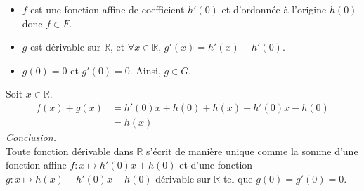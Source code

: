 \documentclass[10pt]{article}
\begin{document}
\begin{tcolorbox}[enhanced, width=7in, center, size=fbox, fontupper=\large, drop shadow southwest]
\begin{equation*}
    \end{equation*}
    \begin{itemize}
        \item $f$ est une fonction affine de coefficient $h'(0)$ et d'ordonnée à l'origine $h(0)$ donc $f\in F$.
        \item $g$ est dérivable sur $\mathbb{R}$, et $\forall{x\in\mathbb{R}}$, $g'(x)=h'(x)-h'(0)$.
        \item $g(0)=0$ et $g'(0)=0$. Ainsi, $g\in G$.
    \end{itemize}
    Soit $x\in\mathbb{R}$.
    \begin{align*}
        f(x) + g(x) 
        &= h'(0)x + h(0) + h(x) - h'(0)x - h(0)\\
        &= h(x)
    \end{align*}
    \emph{Conclusion.}\\
    Toute fonction dérivable dans $\mathbb{R}$ s'écrit de manière unique comme la somme d'une fonction affine $f:x\mapsto h'(0)x+h(0)$ et d'une fonction $g:x\mapsto h(x)-h'(0)x-h(0)$ dérivable sur $\mathbb{R}$ tel que $g(0)=g'(0)=0$.
\end{tcolorbox}
\end{document}
